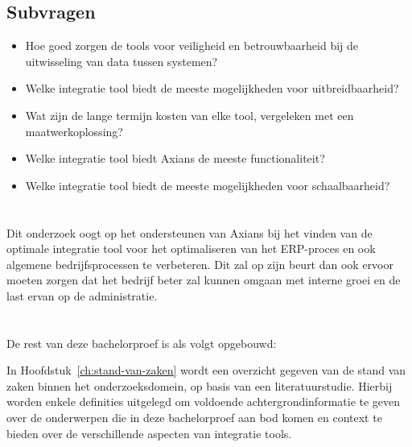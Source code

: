 \subsection{Subvragen}
\label{sec:SubvragenBP}
\begin{itemize}
  \item Hoe goed zorgen de tools voor veiligheid en betrouwbaarheid bij de uitwisseling van data tussen systemen?
  \item Welke integratie tool biedt de meeste mogelijkheden voor uitbreidbaarheid?
  \item Wat zijn de lange termijn kosten van elke tool, vergeleken met een maatwerkoplossing?
  \item Welke integratie tool biedt Axians de meeste functionaliteit?
  \item Welke integratie tool biedt de meeste mogelijkheden voor schaalbaarheid?
\end{itemize}

\section{}%
\label{sec:onderzoeksdoelstelling}

Dit onderzoek oogt op het ondersteunen van Axians bij het vinden van de optimale integratie tool voor het optimaliseren van het ERP-proces en ook algemene bedrijfsprocessen te verbeteren. Dit zal op zijn beurt dan ook ervoor moeten zorgen dat het bedrijf beter zal kunnen omgaan met interne groei en de last ervan op de administratie.

\section{}%
\label{sec:opzet-bachelorproef}


De rest van deze bachelorproef is als volgt opgebouwd:

\vspace{\baselineskip}

In Hoofdstuk~\ref{ch:stand-van-zaken} wordt een overzicht gegeven van de stand van zaken binnen het onderzoeksdomein, op basis van een literatuurstudie. Hierbij worden enkele definities uitgelegd om voldoende achtergrondinformatie te geven over de onderwerpen die in deze bachelorproef aan bod komen en context te bieden over de verschillende aspecten van integratie tools.

